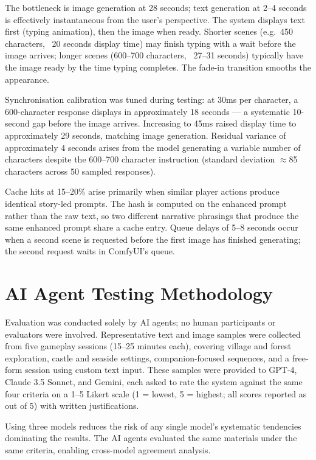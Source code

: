 \documentclass[12pt,a4paper]{article}
\begin{document}
The bottleneck is image generation at 28 seconds; text generation at 2--4 seconds is effectively instantaneous from the user's perspective. The system displays text first (typing animation), then the image when ready. Shorter scenes (e.g.\ 450 characters, ~20 seconds display time) may finish typing with a wait before the image arrives; longer scenes (600--700 characters, ~27--31 seconds) typically have the image ready by the time typing completes. The fade-in transition smooths the appearance.

Synchronisation calibration was tuned during testing: at 30ms per character, a 600-character response displays in approximately 18 seconds --- a systematic 10-second gap before the image arrives. Increasing to 45ms raised display time to approximately 29 seconds, matching image generation. Residual variance of approximately 4 seconds arises from the model generating a variable number of characters despite the 600--700 character instruction (standard deviation $\approx$85 characters across 50 sampled responses).

Cache hits at 15--20\% arise primarily when similar player actions produce identical story-led prompts. The hash is computed on the enhanced prompt rather than the raw text, so two different narrative phrasings that produce the same enhanced prompt share a cache entry. Queue delays of 5--8 seconds occur when a second scene is requested before the first image has finished generating; the second request waits in ComfyUI's queue.

\section{AI Agent Testing Methodology}

Evaluation was conducted solely by AI agents; no human participants or evaluators were involved. Representative text and image samples were collected from five gameplay sessions (15--25 minutes each), covering village and forest exploration, castle and seaside settings, companion-focused sequences, and a free-form session using custom text input. These samples were provided to GPT-4, Claude 3.5 Sonnet, and Gemini, each asked to rate the system against the same four criteria on a 1--5 Likert scale (1 = lowest, 5 = highest; all scores reported as out of 5) with written justifications.

Using three models reduces the risk of any single model's systematic tendencies dominating the results. The AI agents evaluated the same materials under the same criteria, enabling cross-model agreement analysis.
\end{document}
